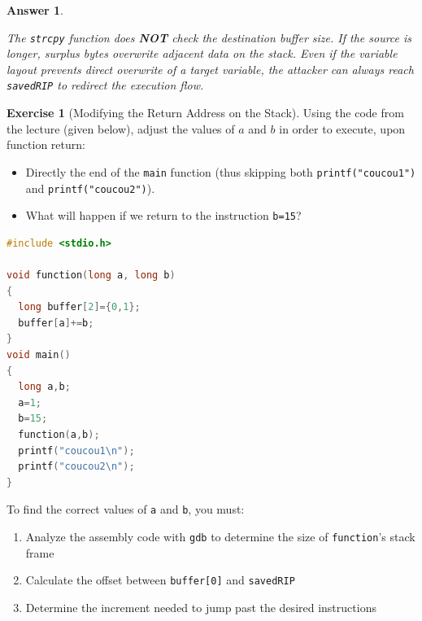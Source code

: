 \documentclass[a4paper,11pt]{article}
\theoremstyle{plain}
\newtheorem{correction}{Answer}
\theoremstyle{definition}
\newtheorem{exercice}{Exercise}
\begin{document}
\begin{correction}
\begin{enumerate}
\end{enumerate}

\begin{pointcle}
The \texttt{strcpy} function does \textbf{NOT} check the destination buffer size. If the source is longer, surplus bytes overwrite adjacent data on the stack. Even if the variable layout prevents direct overwrite of a target variable, the attacker can always reach \texttt{savedRIP} to redirect the execution flow.
\end{pointcle}

\end{correction}

\bigskip



\begin{exercice}[Modifying the Return Address on the Stack]
Using the code from the lecture (given below), adjust the values of $a$ and $b$ in order to execute, upon function return:
\begin{itemize}
\item Directly the end of the \texttt{main} function (thus skipping both \texttt{printf("coucou1")} and \texttt{printf("coucou2")}).
  \item What will happen if we return to the instruction \texttt{b=15}?
\end{itemize}

\begin{lstlisting}[language=C]
#include <stdio.h>

void function(long a, long b)
{
  long buffer[2]={0,1};
  buffer[a]+=b;
}
void main()
{
  long a,b;
  a=1;
  b=15;
  function(a,b);
  printf("coucou1\n");
  printf("coucou2\n");
}
\end{lstlisting}

\begin{rappel}
To find the correct values of \texttt{a} and \texttt{b}, you must:
\begin{enumerate}
    \item Analyze the assembly code with \texttt{gdb} to determine the size of \texttt{function}'s stack frame
    \item Calculate the offset between \texttt{buffer[0]} and \texttt{savedRIP}
    \item Determine the increment needed to jump past the desired instructions
\end{enumerate}
\end{rappel}
\end{exercice}
\end{document}
